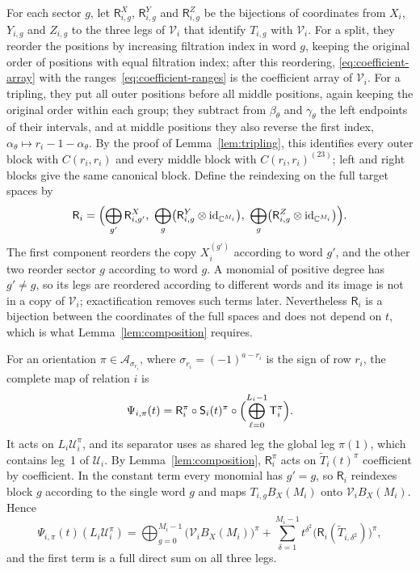 For each sector \(g\), let \(\mathsf R^X_{i,g}\), \(\mathsf R^Y_{i,g}\)
and \(\mathsf R^Z_{i,g}\) be the bijections of coordinates from \(X_i\),
\(Y_{i,g}\) and \(Z_{i,g}\) to the three legs of \(\mathcal V_i\) that
identify \(T_{i,g}\) with \(\mathcal V_i\). For a split, they reorder the
positions by increasing filtration index in word \(g\), keeping the
original order of positions with equal filtration index; after this
reordering, \eqref{eq:coefficient-array} with the
ranges~\eqref{eq:coefficient-ranges} is the coefficient array of
\(\mathcal V_i\). For a tripling, they put all outer positions before all
middle positions, again keeping the original order within each group;
they subtract from \(\beta_\theta\) and \(\gamma_\theta\) the left
endpoints of their intervals, and at middle positions they also reverse
the first index, \(\alpha_\theta\mapsto r_i-1-\alpha_\theta\). By the
proof of Lemma~\ref{lem:tripling}, this identifies every outer block with
\(C(r_i,r_i)\) and every middle block with \(C(r_i,r_i)^{(23)}\); left and
right blocks give the same canonical block. Define the reindexing on the
full target spaces by
\begin{equation}\label{eq:reindexing}
 \mathsf R_i=
 \Bigl(
  \bigoplus_{g'}\mathsf R^X_{i,g'},\
  \bigoplus_g\bigl(\mathsf R^Y_{i,g}\otimes\mathrm{id}_{\mathbb C^{M_i}}\bigr),\
  \bigoplus_g\bigl(\mathsf R^Z_{i,g}\otimes\mathrm{id}_{\mathbb C^{M_i}}\bigr)
 \Bigr).
\end{equation}
The first component reorders the copy \(X_i^{(g')}\) according to word
\(g'\), and the other two reorder sector \(g\) according to word \(g\). A
monomial of positive degree has \(g'\ne g\), so its legs are reordered
according to different words and its image is not in a copy of
\(\mathcal V_i\); exactification removes such terms later. Nevertheless
\(\mathsf R_i\) is a bijection between the coordinates of the full spaces
and does not depend on \(t\), which is what Lemma~\ref{lem:composition}
requires.

For an orientation \(\pi\in\mathcal A_{\sigma_{r_i}}\), where
\(\sigma_{r_i}=(-1)^{a-r_i}\) is the sign of row \(r_i\), the complete map
of relation \(i\) is
\begin{equation}\label{eq:complete-relation-map}
 \Psi_{i,\pi}(t)=\mathsf R_i^\pi\circ\mathsf S_i(t)^\pi\circ
 \Bigl(\bigoplus_{\ell=0}^{L_i-1}\mathsf T_i^\pi\Bigr).
\end{equation}
It acts on \(L_i\mathcal U_i^\pi\), and its separator uses as shared leg
the global leg \(\pi(1)\), which contains leg~1 of \(\mathcal U_i\). By
Lemma~\ref{lem:composition}, \(\mathsf R_i^\pi\) acts on
\(\widetilde T_i(t)^\pi\) coefficient by coefficient. In the constant term
every monomial has \(g'=g\), so \(\mathsf R_i\) reindexes block \(g\)
according to the single word \(g\) and maps \(T_{i,g}B_X(M_i)\) onto
\(\mathcal V_iB_X(M_i)\). Hence
\begin{equation}\label{eq:relation-constant-term}
 \Psi_{i,\pi}(t)(L_i\mathcal U_i^\pi)
 =\bigoplus_{g=0}^{M_i-1}\bigl(\mathcal V_iB_X(M_i)\bigr)^\pi
 +\sum_{\delta=1}^{M_i-1}t^{\delta^2}
   \bigl(\mathsf R_i(\widetilde T_{i,\delta^2})\bigr)^\pi,
\end{equation}
and the first term is a full direct sum on all three legs.

